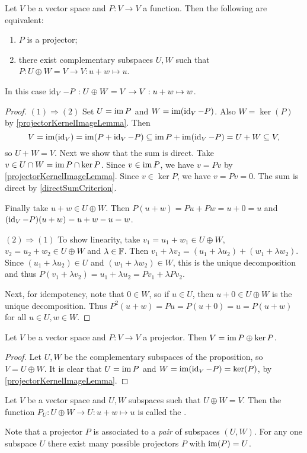 \begin{proposition} \label{projectorComplementarySubspaces}
Let $V$ be a vector space and $P: V\to V$ a function. Then the following are equivalent:
\begin{enumerate}
\item $P$ is a projector;
\item there exist complementary subspaces $U,W$ such that $P: U\oplus W = V \to V: u+w \mapsto u$.
\end{enumerate}
In this case $\operatorname{id}_V - P: U\oplus W = V \to V: u+w \mapsto w$.
\end{proposition}
\begin{proof}
$(1) \Rightarrow (2)$ Set $U = \operatorname{im} P$ and $W = \operatorname{im}(\operatorname{id}_V - P)$. Also $W = \ker(P)$ by \ref{projectorKernelImageLemma}. Then
\[ V = \operatorname{im}(\operatorname{id}_V) = \operatorname{im}(P + \operatorname{id}_V - P) \subseteq \operatorname{im} P + \operatorname{im}(\operatorname{id}_V - P) = U + W \subseteq V, \]
so $U+W = V$. Next we show that the sum is direct. Take $v\in U \cap W = \operatorname{im} P \cap \ker P$. Since $v\in \operatorname{im} P$, we have $v= Pv$ by \ref{projectorKernelImageLemma}. Since $v\in \ker P$, we have $v= Pv = 0$. The sum is direct by \ref{directSumCriterion}.

Finally take $u+w\in U\oplus W$. Then $P(u+w) = Pu + Pw = u+0 = u$ and $(\operatorname{id}_V-P)(u+w) = u+w - u = w$.

$(2) \Rightarrow (1)$ To show linearity, take $v_1 = u_1 +w_1 \in U\oplus W$, $v_2 = u_2 +w_2 \in U\oplus W$ and $\lambda \in \mathbb{F}$. Then $v_1 + \lambda v_2 = (u_1 + \lambda u_2) + (w_1 + \lambda w_2)$. Since $(u_1 + \lambda u_2) \in U$ and $(w_1 + \lambda w_2) \in W$, this is the unique decomposition and thus $P(v_1 + \lambda v_2) = u_1 + \lambda u_2 = Pv_1 + \lambda Pv_2$.

Next, for idempotency, note that $0\in W$, so if $u\in U$, then $u+0\in U\oplus W$ is the unique decomposition. Thus $P^2(u+w) = Pu = P(u + 0) = u = P(u+w)$ for all $u\in U,w\in W$.
\end{proof}
\begin{corollary} \label{directSumKernelImageIdempotent}
Let $V$ be a vector space and $P: V\to V$ a projector. Then $V= \operatorname{im} P \oplus \ker P$.
\end{corollary}
\begin{proof}
Let $U,W$ be the complementary subspaces of the proposition, so $V = U\oplus W$. It is clear that $U = \operatorname{im} P$ and $W = \operatorname{im}(\operatorname{id}_V - P) = \ker(P)$, by \ref{projectorKernelImageLemma}.
\end{proof}

\begin{definition}
Let $V$ be a vector space and $U,W$ subspaces such that $U\oplus W = V$. Then the function $P_U: U\oplus W \to U: u+w \mapsto u$ is called the .
\end{definition}
Note that a projector $P$ is associated to a \emph{pair} of subspaces $(U,W)$. For any one subspace $U$ there exist many possible projectors $P$ with $\operatorname{im}(P) = U$.

